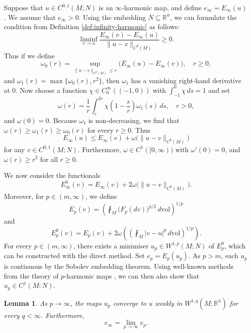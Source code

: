 \documentclass[a4paper]{article}
\newcommand{\R}{\mathbb{R}}
\newcommand{\vol}{\mathrm{vol}}
\newcommand{\ndim}{{\bar{n}}}
\newtheorem{lemma}[theorem]{Lemma}
\theoremstyle{definition}
\theoremstyle{remark}
\begin{document}
Suppose that $u \in C^{0,1}(M; N)$ is an $\infty$-harmonic map,
and define $e_\infty = E_\infty(u)$. We assume that $e_\infty > 0$.
Using the embedding $N \subseteq \R^\ndim$, we can formulate the condition from Definition \ref{def:infinity-harmonic}
as follows:
\[
\liminf_{v \to u} \frac{E_\infty(v) - E_\infty(u)}{\|u - v\|_{C^0(M)}} \ge 0.
\]
Thus if we define
\[
\omega_0(r) = \sup_{\|u - v\|_{C^0(M)} \le r} \bigl(E_\infty(u) - E_\infty(v)\bigr), \quad r \ge 0,
\]
and $\omega_1(r) = \max\{\omega_0(r), r^2\}$, then $\omega_1$ has a vanishing right-hand derivative
at $0$. Now choose a function $\chi \in C_0^\infty((-1, 0))$ with $\int_{-1}^0 \chi \, ds = 1$ and
set
\[
\omega(r) = \frac{1}{r} \int_r^{2r} \chi\left(1 - \frac{s}{r}\right) \omega_1(s) \, ds, \quad r > 0,
\]
and $\omega(0) = 0$. Because $\omega_1$ is non-decreasing, we find that $\omega(r) \ge \omega_1(r) \ge \omega_0(r)$
for every $r \ge 0$. Thus
\begin{equation} \label{eq:u-is-infinity-harmonic}
E_\infty(u) \le E_\infty(v) + \omega\bigl(\|u - v\|_{C^0(M)}\bigr)
\end{equation}
for any $v \in C^{0, 1}(M; N)$. Furthermore, $\omega \in C^1([0, \infty))$
with $\omega'(0) = 0$, and $\omega(r) \ge r^2$ for all $r \ge 0$.

We now consider the functionals
\[
E_\infty^0(v) = E_\infty(v) + 2\omega\bigl(\|u - v\|_{C^0(M)}\bigr).
\]
Moreover, for $p \in (m, \infty)$, we define
\[
E_p(v) = \left(\fint_M \bigl(F_p(dv)\bigr)^{p/2} \, d\vol\right)^{1/p}
\]
and
\[
E_p^0(v) = E_p(v) + 2\omega\left(\left(\fint_M |v - u|^p \, d\vol\right)^{1/p}\right).
\]
For every $p \in (m, \infty)$, there exists a minimiser $u_p \in W^{1, p}(M; N)$ of $E_p^0$, which can be constructed with the direct method.
Set $e_p = E_p(u_p)$.
As $p > m$, each $u_p$ is continuous by the Sobolev embedding theorem. Using
well-known methods from the theory of $p$-harmonic maps \cite{Hardt-Lin:87, Duzaar-Mingione:04}, we can then also show that $u_p \in C^1(M; N)$.

\begin{lemma} \label{lem:convergence-to-u}
As $p \to \infty$, the maps $u_p$ converge to $u$ weakly in $W^{1, q}(M; \R^\ndim)$ for every $q < \infty$. Furthermore,
\[
e_\infty = \lim_{p \to \infty} e_p.
\]
\end{lemma}
\end{document}
